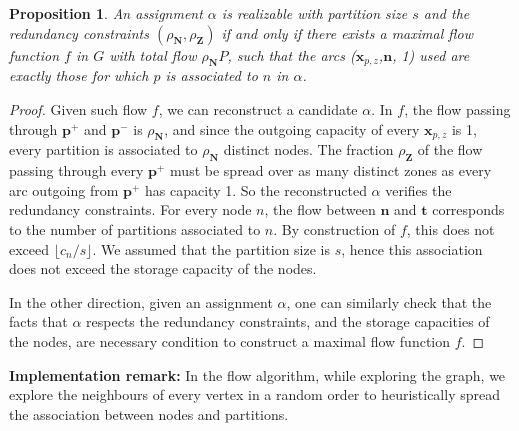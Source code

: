 \documentclass[]{article}
\newtheorem{proposition}{Proposition}
\begin{document}
\begin{proposition}
	An assignment $\alpha$ is realizable with partition size $s$ and the redundancy constraints $(\rho_\mathbf{N},\rho_\mathbf{Z})$ if and only if there exists a maximal flow function $f$ in $G$ with total flow $\rho_\mathbf{N}P$, such that the arcs ($\mathbf{x}_{p,z}$,$\mathbf{n}$, 1) used are exactly those for which $p$ is associated to $n$ in $\alpha$.
\end{proposition}
\begin{proof}
	Given such flow $f$, we can reconstruct a candidate $\alpha$. In $f$, the flow passing through $\mathbf{p^+}$ and $\mathbf{p^-}$ is $\rho_\mathbf{N}$, and since the outgoing capacity of every $\mathbf{x}_{p,z}$ is 1, every partition is associated to $\rho_\mathbf{N}$ distinct nodes. The fraction $\rho_\mathbf{Z}$ of the flow passing through every $\mathbf{p^+}$ must be spread over as many distinct zones as every arc outgoing from $\mathbf{p^+}$ has capacity 1. So the reconstructed $\alpha$ verifies the redundancy constraints. For every node $n$, the flow between $\mathbf{n}$ and $\mathbf{t}$ corresponds to the number of partitions associated to $n$. By construction of $f$, this does not exceed $\lfloor c_n/s \rfloor$. We assumed that the partition size is $s$, hence this association does not exceed the storage capacity of the nodes.
	
	In the other direction, given an assignment $\alpha$, one can similarly check that the facts that $\alpha$ respects the redundancy constraints, and the storage capacities of the nodes, are necessary condition to construct a maximal flow function $f$.
\end{proof}

\textbf{Implementation remark:} In the flow algorithm, while exploring the graph, we explore the neighbours of every vertex in a random order to heuristically spread the association between nodes and partitions.
\end{document}
